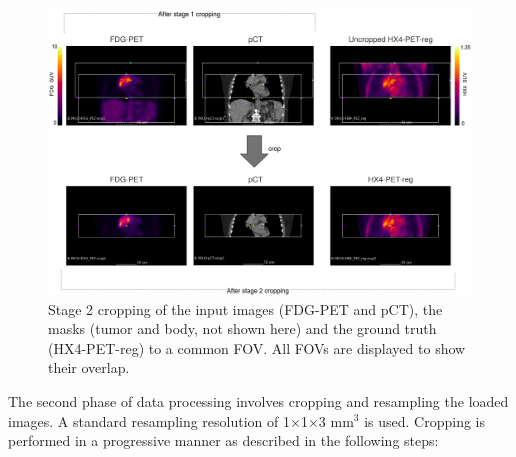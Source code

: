 \begin{figure}[h!]
    \centering
    \includegraphics[width=\linewidth]{figures/Data/fdgpet_pct_hx4petreg_crop2/N010-fdgpet_pct_hx4petreg-uncropped_crop2.png}
    \caption{Stage 2 cropping of the input images (FDG-PET and pCT), the masks (tumor and body, not shown here) and the ground truth (HX4-PET-reg) to a common FOV. All FOVs are displayed to show their overlap.}
    \label{fig:fdgpet_pct_hx4petreg_crop2}
\end{figure}

The second phase of data processing involves cropping and resampling the loaded images. A standard resampling resolution of 1$\times$1$\times$3 mm$^3$ is used. Cropping is performed in a progressive manner as described in the following steps: 

